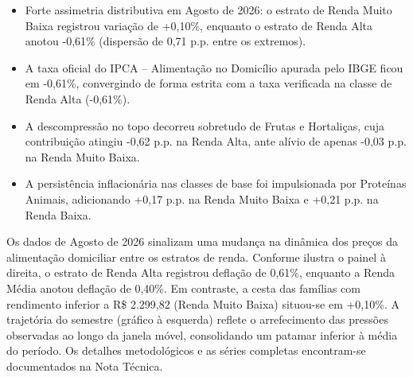 \documentclass[10pt,a4paper]{article}
\begin{document}
	\vspace{0.10cm}
	
	\begin{tcolorbox}[resumobox]
		\begin{itemize}[leftmargin=12pt, itemsep=2pt, topsep=2pt, parsep=0pt]
			
			\item {\small Forte assimetria distributiva em Agosto de 2026: o estrato de Renda Muito Baixa registrou variação de +0,10\%, enquanto o estrato de Renda Alta anotou -0,61\% (dispersão de 0,71 p.p. entre os extremos).}
			
			\item {\small A taxa oficial do IPCA -- Alimentação no Domicílio apurada pelo IBGE ficou em -0,61\%, convergindo de forma estrita com a taxa verificada na classe de Renda Alta (-0,61\%).}
			
			\item {\small A descompressão no topo decorreu sobretudo de Frutas e Hortaliças, cuja contribuição atingiu -0,62 p.p. na Renda Alta, ante alívio de apenas -0,03 p.p. na Renda Muito Baixa.}
			
			\item {\small A persistência inflacionária nas classes de base foi impulsionada por Proteínas Animais, adicionando +0,17 p.p. na Renda Muito Baixa e +0,21 p.p. na Renda Baixa.}
			
		\end{itemize}
	\end{tcolorbox}
	
	\vspace{0.12cm}
	
	
	\vspace{0.06cm}
	
	{\small Os dados de Agosto de 2026 sinalizam uma mudança na dinâmica dos preços da alimentação domiciliar entre os estratos de renda. Conforme ilustra o painel à direita, o estrato de Renda Alta registrou deflação de 0,61\%, enquanto a Renda Média anotou deflação de 0,40\%. Em contraste, a cesta das famílias com rendimento inferior a R\$ 2.299,82 (Renda Muito Baixa) situou-se em +0,10\%. A trajetória do semestre (gráfico à esquerda) reflete o arrefecimento das pressões observadas ao longo da janela móvel, consolidando um patamar inferior à média do período. Os detalhes metodológicos e as séries completas encontram-se documentados na Nota Técnica.}
	
\end{document}
